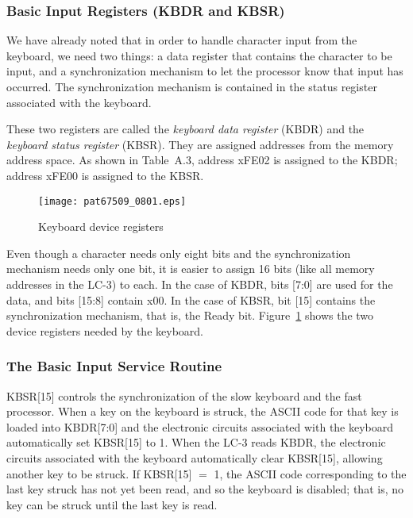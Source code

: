 \documentclass{patt}
\begin{document}
\subsubsection{Basic Input Registers (KBDR and KBSR)}

We have already noted that in order to handle character input from the
keyboard, we need two things: a data register that contains the
character to be input, and a synchronization mechanism to let the
processor know that input has occurred.  The synchronization mechanism
is contained in the status register associated with the keyboard.

These two registers are called the {\em keyboard data register} (KBDR)
and the   {\em keyboard
  status register} (KBSR).  They are assigned addresses from the
memory   address space.
As shown in Table~A.3, address xFE02 is assigned to the KBDR; address xFE00
is assigned to the KBSR.

\begin{figure}[h!]
\centerline{\texttt{[image: pat67509\_0801.eps]}}
\caption{Keyboard device registers}
\label{fig:kbdr}
\end{figure}

Even though a character needs only eight bits and the synchronization
mechanism needs only one bit, it is easier to assign 16 bits (like all
memory addresses in the LC-3) to each.  In the case of KBDR, bits
[7:0] are used for the data, and bits [15:8] contain x00. In the case
of KBSR, bit [15] contains the synchronization mechanism, that is, the
Ready bit.  Figure~\ref{fig:kbdr} shows the two device registers
needed by the keyboard.

\subsubsection{The Basic Input Service Routine}
\label{subsubsec:basic.input.routine}

KBSR[15] controls the synchronization of the slow keyboard and the
fast processor.  When a key on the keyboard is struck, the ASCII code
for that key is loaded into KBDR[7:0] and the electronic circuits
associated with the keyboard automatically set KBSR[15] to 1.  When
the LC-3 reads KBDR, the electronic circuits associated with the
keyboard automatically clear KBSR[15], allowing another key to be
struck.  If KBSR[15] $=$ 1, the ASCII code corresponding to the last
key struck has not yet been read, and so the keyboard is disabled; that is,
no key can be struck until the last key is read.
\end{document}
